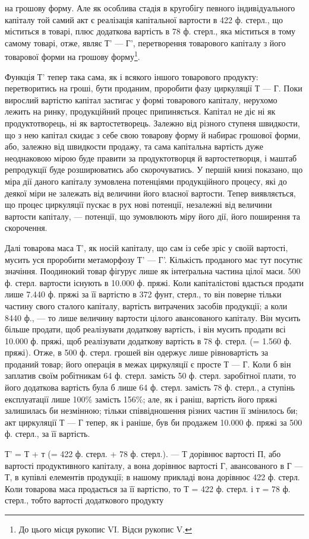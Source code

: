 \parcont{}  %
на грошову форму. Але як особлива стадія в кругобігу певного індивідуального
капіталу той самий акт є реалізація капітальної вартости
в 422 ф. стерл., що міститься в товарі, плюс додаткова вартість в 78 ф.
стерл., яка міститься в тому самому товарі, отже, являє Т' — Г', перетворення
товарового капіталу з його товарової форми на грошову форму\footnote{
До цього місця рукопис VI. Відси рукопис V.
}.

Функція Т' тепер така сама, як і всякого іншого товарового продукту:
перетворитись на гроші, бути проданим, проробити фазу циркуляції
Т — Г. Поки вирослий вартістю капітал застигає у формі товарового
капіталу, нерухомо лежить на ринку, продукційний процес припиняється.
Капітал не діє ні як продуктотворець, ні як вартостетворець. Залежно від
різного ступеня швидкости, що з нею капітал скидає з себе свою товарову
форму й набирає грошової форми, або, залежно від швидкости продажу,
та сама капітальна вартість дуже неоднаковою мірою буде правити за
продуктотворця й вартостетворця, і маштаб репродукції буде розширюватись
або скорочуватись. У першій книзі показано, що міра дії даного
капіталу зумовлена потенціями продукційного процесу, які до деякої
міри не залежать від величини його власної вартости. Тепер виявляється,
що процес циркуляції пускає в рух нові потенції, незалежні від величини
вартости капіталу, — потенції, що зумовлюють міру його дії, його поширення
та скорочення.

Далі товарова маса Т', як носій капіталу, що сам із себе зріс у своїй
вартості, мусить уся проробити метаморфозу Т' — Г'. Кількість проданого
має тут посутнє значіння. Поодинокий товар фігурує лише як інтеґральна
частина цілої маси. 500 ф. стерл. вартости існують в 10.000 ф. пряжі.
Коли капіталістові вдасться продати лише 7.440 ф. пряжі за її вартістю
в 372 фунт, стерл., то він поверне тільки частину свого сталого капіталу,
вартість витрачених засобів продукції; а коли 8440 ф., — то лише величину
вартости цілого авансованого капіталу. Він мусить більше продати, щоб
реалізувати додаткову вартість, і він мусить продати всі 10.000 ф.
пряжі, щоб реалізувати додаткову вартість в 78 ф. стерл. (= 1.560 ф.
пряжі). Отже, в 500 ф. стерл. грошей він одержує лише рівновартість
за проданий товар; його операція в межах циркуляції є просте Т — Г.
Коли б він заплатив своїм робітникам 64 ф. стерл. замість 50 ф. стерл.
заробітної плати, то його додаткова вартість була б лише 64 ф. стерл.
замість 78 ф. стерл., а ступінь експлуатації лише 100\% замість
156\%; але, як і раніш, вартість його пряжі залишилась би незмінною;
тільки співвідношення різних частин її змінилось би; акт циркуляції Т — Г
тепер, як і раніше, був би продажем 10.000 ф. пряжі за 500 ф. стерл.,
за її вартість.

Т' = Т + т (= 422 ф. стерл. + 78 ф. стерл.). — Т дорівнює вартості П,
або вартості продуктивного капіталу, а вона дорівнює вартості Г, авансованого
в Г — Т, в купівлі елементів продукції; в нашому прикладі вона
дорівнює 422 ф. стерл. Коли товарова маса продається за її вартістю, то
Т = 422 ф. стерл. і т = 78 ф. стерл., тобто вартості додаткового продукту
\parbreak{}  %
